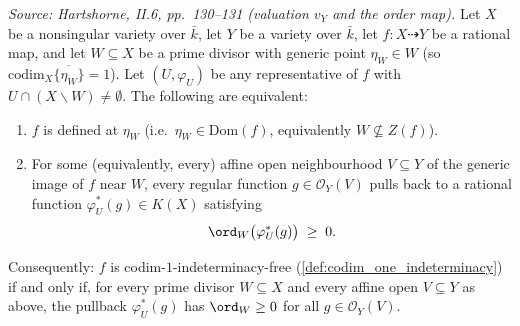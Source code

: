 \begin{theorem}
  \textit{Source: Hartshorne, II.6, pp.~130--131 (valuation \(v_Y\) and the order map).}
  Let \(X\) be a nonsingular variety over \(\bar k\), let \(Y\) be a variety over \(\bar k\),
  let \(f \colon X \dashrightarrow Y\) be a rational map, and let \(W \subseteq X\) be a
  prime divisor with generic point \(\eta_W \in W\) (so
  \(\mathrm{codim}_X \overline{\{\eta_W\}} = 1\)). Let \((U, \varphi_U)\) be any representative of
  \(f\) with \(U \cap (X \smallsetminus W) \neq \emptyset\). The following are equivalent:
  \begin{enumerate}
    \item \(f\) is defined at \(\eta_W\) (i.e.\ \(\eta_W \in \mathrm{Dom}(f)\), equivalently
      \(W \not\subseteq Z(f)\)).
    \item For some (equivalently, every) affine open neighbourhood \(V \subseteq Y\) of
      the generic image of \(f\) near \(W\), every regular function \(g \in
      \mathcal O_Y(V)\) pulls back to a rational function \(\varphi_U^\ast(g) \in K(X)\)
      satisfying
      \[
        \ord_W\bigl(\varphi_U^\ast(g)\bigr) \;\geq\; 0.
      \]
  \end{enumerate}

  Consequently: \(f\) is codim-\(1\)-indeterminacy-free
  (\cref{def:codim_one_indeterminacy}) if and only if, for every prime divisor
  \(W \subseteq X\) and every affine open \(V \subseteq Y\) as above, the pullback
  \(\varphi_U^\ast(g)\) has \(\ord_W \geq 0\) for all \(g \in \mathcal O_Y(V)\).
\end{theorem}

